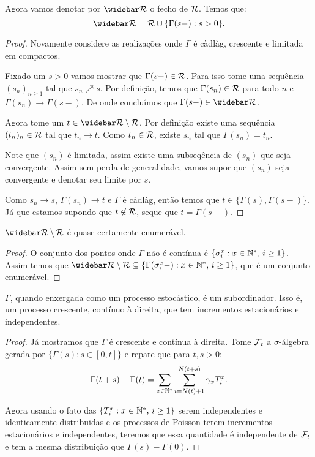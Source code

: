 \begin{proposicao}
  Agora vamos denotar por $\RRb$ o fecho de ${\mathcal{R}}$. Temos que:
  \begin{displaymath}
    \RRb = \RR \cup \{ \Gamma(s-) : s > 0 \}.
  \end{displaymath}
\end{proposicao}
\begin{proof}
  Novamente considere as realizações onde $\Gamma$ é càdlàg, crescente
  e limitada em compactos.

  Fixado um $s > 0$ vamos mostrar que $\Gamma(s-) \in {\mathcal{R}}$. Para isso
  tome uma sequência $(s_n)_{n \geq 1}$ tal que $s_n \nearrow s$. Por
  definição, temos que $\Gamma(s_n) \in {\mathcal{R}}$ para todo $n$ e
  $\Gamma(s_n) \to \Gamma(s-)$. De onde concluímos que $\Gamma(s-) \in
  \RRb$.

  Agora tome um $t \in \RRb \setminus \RR$. Por definição existe uma
  sequência $(t_n)_n \in {\mathcal{R}}$ tal que $t_n \to t$. Como $t_n \in {\mathcal{R}}$,
  existe $s_n$ tal que $\Gamma(s_n) = t_n$.

  Note que $(s_n)$ é limitada, assim existe uma subseqência de $(s_n)$
  que seja convergente. Assim sem perda de generalidade, vamos supor
  que $(s_n)$ seja convergente e denotar seu limite por $s$.

  Como $s_n \to s$, $\Gamma(s_n) \to t$ e $\Gamma$ é càdlàg, então
  temos que $t \in \{ \Gamma(s), \Gamma(s-) \}$. Já que estamos
  supondo que $t \not\in {\mathcal{R}}$, seque que $t = \Gamma(s-)$.
\end{proof}

\begin{proposicao}
  $\RRb \setminus \RR$ é quase certamente enumerável.
\end{proposicao}
\begin{proof}
  O conjunto dos pontos onde $\Gamma$ não é contínua é $\{ \sigma_i^x:
  x \in {\mathbb{N^*}}, \, i \geq 1\}$. Assim temos que $\RRb \setminus \RR
  \subseteq \{ \Gamma(\sigma_i^x-): x \in \Nz, \, i \geq 1\}$, que é
  um conjunto enumerável.
\end{proof}

\begin{proposicao}
  $\Gamma$, quando enxergada como um processo estocástico, é um
  subordinador. Isso é, um processo crescente, contínuo à direita, que
  tem incrementos estacionários e independentes.
\end{proposicao}
\begin{proof}

  Já mostramos que $\Gamma$ é crescente e contínua à direita.  Tome
  ${\mathcal{F}}_t$ a $\sigma$-álgebra gerada por $\{ \Gamma(s): s \in [0,
  t]\}$ e repare que para $t, s > 0$:
  \begin{displaymath}
    \Gamma(t+s) - \Gamma(t) = \sum_{x \in {\mathbb{N^*}}} \sum_{i =
      N(t)+1}^{N(t+s)} \gamma_x T_i^x.
  \end{displaymath}

  Agora usando o fato das $\{ T_i^x: x \in {\mathbb{\bar{N}^*}}, \, i \geq 1\}$ serem
  independentes e identicamente distribuidas e os processos de Poisson
  terem incrementos estacionários e independentes, teremos que essa
  quantidade é independente de ${\mathcal{F}}_t$ e tem a mesma distribuição que
  $\Gamma(s) - \Gamma(0)$.
\end{proof}

